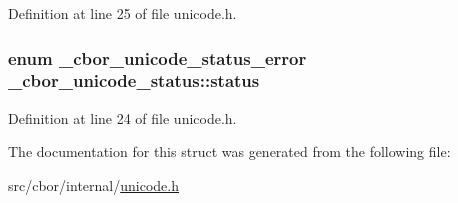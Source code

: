 Definition at line 25 of file unicode.\-h.

\hypertarget{struct__cbor__unicode__status_a06b8c4d673a659a046aa3adea53cdef8}{
\subsubsection[{status}]{\setlength{\rightskip}{0pt plus 5cm}enum {\bf \-\_\-cbor\-\_\-unicode\-\_\-status\-\_\-error} \-\_\-cbor\-\_\-unicode\-\_\-status\-::status}}\label{struct__cbor__unicode__status_a06b8c4d673a659a046aa3adea53cdef8}


Definition at line 24 of file unicode.\-h.



The documentation for this struct was generated from the following file\-:\begin{DoxyCompactItemize}
\item 
src/cbor/internal/\hyperlink{unicode_8h}{unicode.\-h}\end{DoxyCompactItemize}
